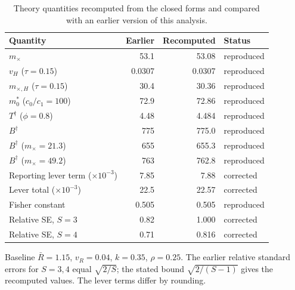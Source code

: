 \begin{table}[htbp]
\centering
\footnotesize
\caption{Theory quantities recomputed from the closed forms and compared with an earlier version of this analysis.}
\label{tab:s7}
\begin{tabular}{lrrl}
\toprule
Quantity & Earlier & Recomputed & Status \\
\midrule
$m_\times$ & 53.1 & 53.08 & reproduced \\
$v_H$ ($\tau=0.15$) & 0.0307 & 0.0307 & reproduced \\
$m_{\times,H}$ ($\tau=0.15$) & 30.4 & 30.36 & reproduced \\
$m_0^*$ ($c_0/c_1=100$) & 72.9 & 72.86 & reproduced \\
$T^\dagger$ ($\phi=0.8$) & 4.48 & 4.484 & reproduced \\
$B^\dagger$ & 775 & 775.0 & reproduced \\
$B^\dagger$ ($m_\times=21.3$) & 655 & 655.3 & reproduced \\
$B^\dagger$ ($m_\times=49.2$) & 763 & 762.8 & reproduced \\
Reporting lever term ($\times10^{-3}$) & 7.85 & 7.88 & corrected \\
Lever total ($\times10^{-3}$) & 22.5 & 22.57 & corrected \\
Fisher constant & 0.505 & 0.505 & reproduced \\
Relative SE, $S=3$ & 0.82 & 1.000 & corrected \\
Relative SE, $S=4$ & 0.71 & 0.816 & corrected \\
\bottomrule
\end{tabular}
\par\smallskip
\begin{minipage}{0.95\linewidth}\scriptsize Baseline $\bar{R}=1.15$, $v_R=0.04$, $k=0.35$, $\rho=0.25$. The earlier relative standard errors for $S=3,4$ equal $\sqrt{2/S}$; the stated bound $\sqrt{2/(S-1)}$ gives the recomputed values. The lever terms differ by rounding.\end{minipage}
\end{table}
